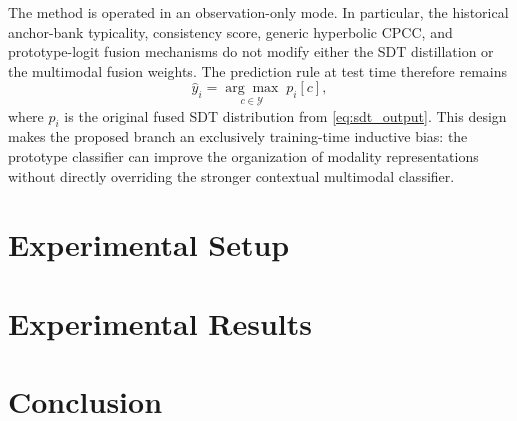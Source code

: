 \documentclass[letterpaper,journal]{IEEEtran}
\begin{document}
The method is operated in an observation-only mode. In particular, the
historical anchor-bank typicality, consistency score, generic hyperbolic CPCC,
and prototype-logit fusion mechanisms do not modify either the SDT
distillation or the multimodal fusion weights. The prediction rule at test time
therefore remains
\begin{equation}
    \hat{y}_i
    =\underset{c\in\mathcal{Y}}{\arg\max}\;p_i[c],
    \label{eq:method_inference}
\end{equation}
where \(p_i\) is the original fused SDT distribution from
\eqref{eq:sdt_output}. This design makes the proposed branch an exclusively
training-time inductive bias: the prototype classifier can improve the
organization of modality representations without directly overriding the
stronger contextual multimodal classifier.

\section{Experimental Setup}
\label{sec:experimental_setup}

\section{Experimental Results}
\label{sec:experimental_results}

\section{Conclusion}
\label{sec:conclusion}
\end{document}
